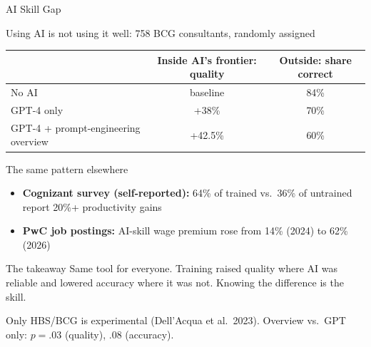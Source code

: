 \documentclass[aspectratio=169, 11pt]{beamer}
\begin{document}
\begin{frame}{AI Skill Gap}
  \small
  \begin{block}{Using AI is not using it well: 758 BCG consultants, randomly assigned}
    \centering
    \footnotesize
    \begin{tabular}{@{}lcc@{}}
      \toprule
      & \textbf{Inside AI's frontier: quality} & \textbf{Outside: share correct} \\
      \midrule
      No AI                                  & baseline  & 84\% \\
      GPT-4 only                             & +38\%     & 70\% \\
      GPT-4 + prompt-engineering overview    & +42.5\%   & 60\% \\
      \bottomrule
    \end{tabular}
  \end{block}

  \begin{block}{The same pattern elsewhere}
    \footnotesize
    \begin{itemize}
      \item \textbf{Cognizant survey (self-reported):} 64\% of trained vs.\ 36\% of untrained report 20\%+ productivity gains
      \item \textbf{PwC job postings:} AI-skill wage premium rose from 14\% (2024) to 62\% (2026)
    \end{itemize}
  \end{block}

  \begin{alertblock}{The takeaway}
    \footnotesize
    Same tool for everyone. Training raised quality where AI was reliable and lowered accuracy where it was not. Knowing the difference is the skill.
  \end{alertblock}

  \vspace{-0.2em}
  {\tiny Only HBS/BCG is experimental (Dell'Acqua et al.\ 2023). Overview vs.\ GPT only: $p=.03$ (quality), $.08$ (accuracy).}
\end{frame}
\end{document}
